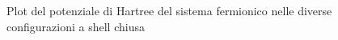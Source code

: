 \documentclass[11pt,a4paper]{article}
\begin{document}
\begin{figure}[!h]
\hspace{3mm}
\caption{Plot del potenziale di Hartree del sistema fermionico nelle diverse configurazioni a shell chiusa}
\end{figure}\ \\
\newpage
\end{document}
